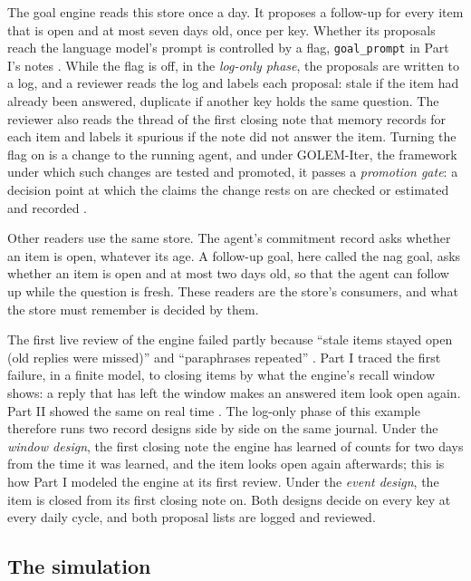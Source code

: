\documentclass[11pt]{article}
\newcommand{\code}[1]{\texttt{#1}}
\theoremstyle{definition}
\theoremstyle{plain}
\begin{document}
The goal engine reads this store once a day. It proposes a follow-up for every item that is open
and at most seven days old, once per key. Whether its proposals reach the language model's prompt
is controlled by a flag, \code{goal\_prompt} in Part I's notes \cite[Section~4.5]{part1}. While the
flag is off, in the \emph{log-only phase}, the proposals are written to a log, and a reviewer reads
the log and labels each proposal: stale if the item had already been answered, duplicate if another
key holds the same question. The reviewer also reads the thread of the first closing note that
memory records for each item and labels it spurious if the note did not answer the item. Turning the flag on is a change to the running
agent, and under GOLEM-Iter, the framework under which such changes are tested and promoted, it
passes a \emph{promotion gate}: a decision point at which the claims the change rests on are
checked or estimated and recorded \cite{golemspec}.

Other readers use the same store. The agent's commitment record asks whether an item is open,
whatever its age. A follow-up goal, here called the nag goal, asks whether an item is open and at
most two days old, so that the agent can follow up while the question is fresh. These readers are
the store's consumers, and what the store must remember is decided by them.

The first live review of the engine failed partly because ``stale items stayed open (old replies
were missed)'' and ``paraphrases repeated'' \cite{wmtm}. Part I traced the first failure, in a
finite model, to closing items by what the engine's recall window shows: a reply that has left the
window makes an answered item look open again. Part II showed the same on real time
\cite[Section~6.1]{part2}. The log-only phase of this example therefore runs two record designs
side by side on the same journal. Under the \emph{window design}, the first closing note the engine
has learned of counts for two days from the time it was learned, and the item looks open again
afterwards; this is how Part I modeled the engine at its first review. Under the \emph{event
design}, the item is closed from its first closing note on. Both designs decide on every key at
every daily cycle, and both proposal lists are logged and reviewed.

\subsection{The simulation}\label{sec:sim}
\end{document}
